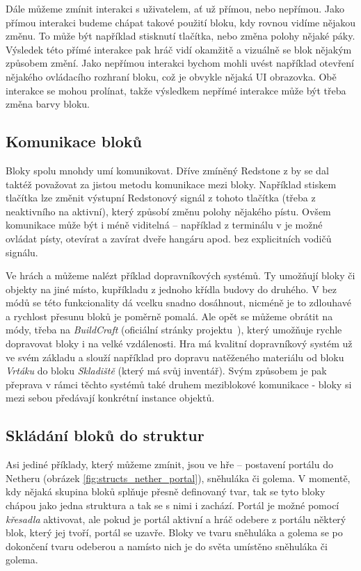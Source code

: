 Dále můžeme zmínit interakci s uživatelem, ať už přímou, nebo nepřímou. Jako přímou interakci budeme chápat takové použití bloku, kdy rovnou vidíme nějakou změnu. To může být například stisknutí tlačítka, nebo změna polohy nějaké páky. Výsledek této přímé interakce pak hráč vidí okamžitě a vizuálně se blok nějakým způsobem změní. Jako nepřímou interakci bychom mohli uvést například otevření nějakého ovládacího rozhraní bloku, což je obvykle nějaká UI obrazovka. Obě interakce se mohou prolínat, takže výsledkem nepřímé interakce může být třeba změna barvy bloku.


\subsection{Komunikace bloků}
Bloky spolu mnohdy umí komunikovat. Dříve zmíněný Redstone z  by se dal taktéž považovat za jistou metodu komunikace mezi bloky. Například stiskem tlačítka lze změnit výstupní Redstonový signál z tohoto tlačítka (třeba z neaktivního na aktivní), který způsobí změnu polohy nějakého pístu. Ovšem komunikace může být i méně viditelná -- například z terminálu v \SE{} je možné ovládat písty, otevírat a zavírat dveře hangáru apod. bez explicitních vodičů signálu.

Ve hrách \MC{} a \SE{} můžeme nalézt příklad dopravníkových systémů. Ty umožňují  bloky či objekty na jiné místo, kupříkladu z jednoho křídla budovy do druhého. V  bez módů se této funkcionality dá vcelku snadno dosáhnout, nicméně je to zdlouhavé a rychlost přesunu bloků je poměrně pomalá. Ale opět se můžeme obrátit na módy, třeba na \textit{BuildCraft} (oficiální stránky projektu~\citep{buildcraft}), který umožňuje rychle dopravovat bloky i na velké vzdálenosti. Hra \SE{} má kvalitní dopravníkový systém už ve svém základu a slouží například pro dopravu natěženého materiálu od bloku \textit{Vrtáku} do bloku \textit{Skladiště} (který má svůj inventář). Svým způsobem je pak přeprava v rámci těchto systémů také druhem meziblokové komunikace - bloky si mezi sebou předávají konkrétní instance objektů.

\subsection{Skládání bloků do struktur}
Asi jediné příklady, který můžeme zmínit, jsou ve hře \MC{} -- postavení portálu do Netheru (obrázek \ref{fig:structs_nether_portal}), sněhuláka či golema. V momentě, kdy nějaká skupina bloků splňuje přesně definovaný tvar, tak se tyto bloky chápou jako jedna struktura a tak se s nimi i zachází. Portál je možné pomocí \textit{křesadla} aktivovat, ale pokud je portál aktivní a hráč odebere z portálu některý blok, který jej tvoří, portál se uzavře. Bloky ve tvaru sněhuláka a golema se po dokončení tvaru odeberou a namísto nich je do světa umístěno \NPC{} sněhuláka či golema.

